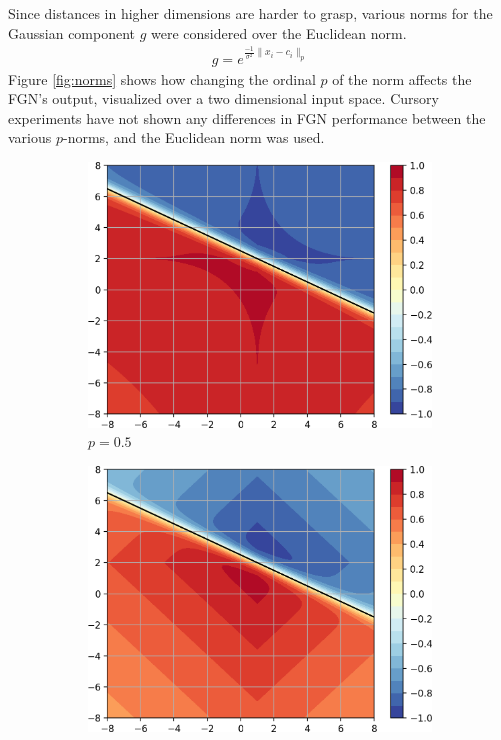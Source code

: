 \documentclass[12pt,oneside]{CUNY_PhD}
\begin{document}
Since distances in higher dimensions are harder to grasp, various norms for the Gaussian component $g$ were considered over the Euclidean norm.
\begin{align}
    g = e^{\frac{-1}{\sigma^2}\lVert x_i-c_i \lVert_p }
\end{align}
Figure \ref{fig:norms} shows how changing the ordinal $p$ of the norm affects the FGN's output, visualized over a two dimensional input space. Cursory experiments have not shown any differences in FGN performance between the various $p$-norms, and the Euclidean norm was used.
\begin{figure}[!t]
    \centering
    \begin{subfigure}[t]{0.32\textwidth}
        \includegraphics[width=\textwidth]{images/Variants-Norms/ord0.5-cropped.png}
        \caption*{$p=0.5$}
    \end{subfigure}
    \begin{subfigure}[t]{0.32\textwidth}
        \includegraphics[width=\textwidth]{images/Variants-Norms/ord1-cropped.png}

\end{subfigure}
\end{figure}
\end{document}
